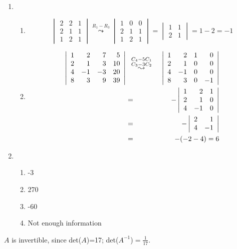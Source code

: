 \documentclass[12pt]{article}
\begin{document}
\noindent {\bf \ref{ssec.propdet}:}
\begin{enumerate}
\item
\begin{enumerate}
\item
$$
\begin{vmatrix}2&2&1\\2&1&1\\1&2&1\end{vmatrix} \overset{R_1 - R_3}{\leadsto}
\begin{vmatrix}1&0&0\\2&1&1\\1&2&1\end{vmatrix} = \begin{vmatrix}1&1\\2&1\end{vmatrix} = 1-2 =-1
$$
\item
\begin{eqnarray*}
\left| \begin{array}{rrrr} 1&2&7&5\\2&1&3&10\\4&-1&-3&20\\8&3&9&39
\end{array} \right|
&& \hspace{-5mm}\overset{\begin{smallmatrix}C_4 -
5C_1\\C_3-3C_2\end{smallmatrix}}{\leadsto} \quad \left|
\begin{array}{rrrr} 1&2&1&0\\2&1&0&0\\4&-1&0&0\\8&3&0&-1
\end{array} \right|\\
&=&
- \left| \begin{array}{rrr} 1&2&1\\2&1&0\\4&-1&0\end{array} \right| \\
&=& - \left| \begin{array}{rr}2&1\\4&-1\end{array} \right| \\&=&
-(-2-4) = 6
\end{eqnarray*}
\end{enumerate}
\item
\begin{enumerate}
\item -3
\item 270
\item -60
\item Not enough information
\end{enumerate}
\end{enumerate}
\noindent {\bf \ref{ssec.adjoint}:}  $A$ is invertible, since
det($A$)=17;  det($A^{-1}$)$=\frac{1}{17}$.
\end{document}
